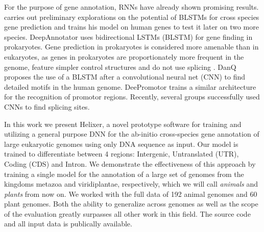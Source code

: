 \documentclass{bioinfo}
\begin{document}
For the purpose of gene annotation, RNNs have already shown promising results. 
\citep{choudharypredicting} carries out preliminary explorations on the potential 
of BLSTMs for cross species gene prediction and trains his model on human genes to 
test it later on two more species. DeepAnnotator \citep{amin2018deepannotator} uses 
bidirectional LSTMs (BLSTM) for gene finding in prokaryotes. Gene prediction in 
prokaryotes is considered more amenable than in eukaryotes, as genes in prokaryotes 
are proportionately more frequent in the genome, feature simpler control structures 
and do not use splicing \citep{wang2004brief}. DanQ \citep{quang2016danq} proposes 
the use of a BLSTM after a convolutional neural net (CNN) to find detailed motifs in 
the human genome. DeePromotor \citep{oubounyt2019deepromoter} trains a similar 
architecture for the recognition of promotor regions. Recently, several groups 
\citep{jaganathan2019predicting, wang2019splicefinder} successfully used CNNs to 
find splicing sites.

In this work we present Helixer, a novel prototype software for training and 
utilizing a general purpose DNN for the ab-initio cross-species gene annotation of 
large eukaryotic genomes using only DNA sequence as input. Our model is trained to 
differentiate between 4 regions: Intergenic, Untranslated (UTR), Coding (CDS) and 
Intron. We demonstrate the effectiveness of this approach by training a single model 
for the annotation of a large set of genomes from the kingdoms metazoa and 
viridiplantae, respectively, which we will call {\it animals} and {\it plants} from 
now on. We worked with the full data of 192 animal genomes and 60 plant genomes. 
Both the ability to generalize across genomes as well as the scope of the evaluation 
greatly surpasses all other work in this field. The source code and all input data 
is publically available.
\end{document}
